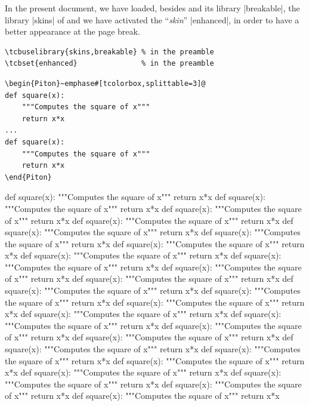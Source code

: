 \documentclass{article}
\begin{document}
\bigskip
In the present document, we have loaded, besides  and its library
|breakable|, the library |skins| of  and we have activated the
``\emph{skin}'' |enhanced|, in order to have a better appearance at the page break.


\begin{footnotesize}
\begin{Verbatim}
\tcbuselibrary{skins,breakable} % in the preamble
\tcbset{enhanced}               % in the preamble 
\end{Verbatim}
\end{footnotesize}

\begin{Verbatim}
\begin{Piton}~emphase#[tcolorbox,splittable=3]@
def square(x):
    """Computes the square of x"""
    return x*x
...
def square(x):
    """Computes the square of x"""
    return x*x
\end{Piton}
\end{Verbatim}

\begin{Piton}[tcolorbox,splittable=3]
def square(x):
    """Computes the square of x"""
    return x*x
def square(x):
    """Computes the square of x"""
    return x*x
def square(x):
    """Computes the square of x"""
    return x*x
def square(x):
    """Computes the square of x"""
    return x*x
def square(x):
    """Computes the square of x"""
    return x*x
def square(x):
    """Computes the square of x"""
    return x*x
def square(x):
    """Computes the square of x"""
    return x*x
def square(x):
    """Computes the square of x"""
    return x*x
def square(x):
    """Computes the square of x"""
    return x*x
def square(x):
    """Computes the square of x"""
    return x*x
def square(x):
    """Computes the square of x"""
    return x*x
def square(x):
    """Computes the square of x"""
    return x*x
def square(x):
    """Computes the square of x"""
    return x*x
def square(x):
    """Computes the square of x"""
    return x*x
def square(x):
    """Computes the square of x"""
    return x*x
def square(x):
    """Computes the square of x"""
    return x*x
def square(x):
    """Computes the square of x"""
    return x*x
def square(x):
    """Computes the square of x"""
    return x*x
def square(x):
    """Computes the square of x"""
    return x*x
def square(x):
    """Computes the square of x"""
    return x*x
def square(x):
    """Computes the square of x"""
    return x*x
def square(x):
    """Computes the square of x"""
    return x*x
def square(x):
    """Computes the square of x"""
    return x*x
def square(x):
    """Computes the square of x"""
    return x*x
def square(x):
    """Computes the square of x"""
    return x*x
\end{Piton}
\end{document}
